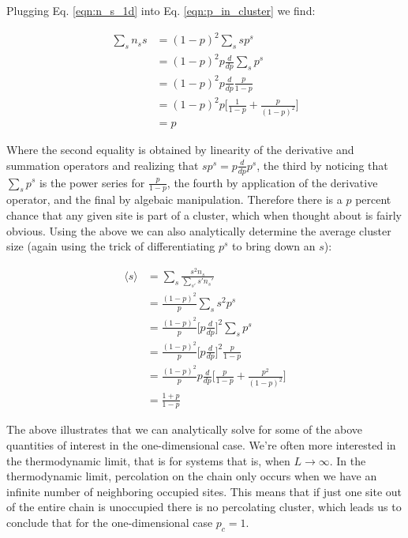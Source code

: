 Plugging Eq. \ref{eqn:n_s_1d} into Eq. \ref{eqn:p_in_cluster} we find:

\begin{equation}
\begin{split}
	\sum_s n_s s &= (1 - p)^2 \sum_s s p^s\\
	&= (1 - p)^2 p \frac{d}{dp} \sum_s p^s\\
	&= (1 - p)^2 p \frac{d}{dp} \frac{p}{1-p}\\
	&= (1 - p)^2 p \bigg[ \frac{1}{1-p} + \frac{p}{(1 - p)^2} \bigg]\\
	&= p
\end{split}
\end{equation}

Where the second equality is obtained by linearity of the derivative and summation operators and realizing that $s p^s = p \frac{d}{dp} p^s$, the third by noticing that $\sum_s p^s$ is the power series for $\frac{p}{1-p}$, the fourth by application of the derivative operator, and the final by algebaic manipulation.
Therefore there is a $p$ percent chance that any given site is part of a cluster, which when thought about is fairly obvious.
Using the above we can also analytically determine the average cluster size (again using the trick of differentiating $p^s$ to bring down an $s$):

\begin{equation}
\begin{split}
	\langle s \rangle &= \sum_s \frac{s^2 n_s}{\sum_{s'} s' n_s'}\\
	&= \frac{(1 - p)^2}{p} \sum_s s^2 p^s\\
	&= \frac{(1 - p)^2}{p} \bigg[p\frac{d}{dp}\bigg]^2 \sum_s p^s\\
	&= \frac{(1 - p)^2}{p} \bigg[p\frac{d}{dp}\bigg]^2 \frac{p}{1 - p}\\
	&= \frac{(1 - p)^2}{p} p \frac{d}{dp} \bigg[ \frac{p}{1-p} + \frac{p^2}{(1 - p)^2} \bigg]\\
	&= \frac{1 + p}{1 - p}
\end{split}
\end{equation}

The above illustrates that we can analytically solve for some of the above quantities of interest in the one-dimensional case.
We're often more interested in the thermodynamic limit, that is for systems that is, when $L \rightarrow \infty$.
In the thermodynamic limit, percolation on the chain only occurs when we have an infinite number of neighboring occupied sites.
This means that if just one site out of the entire chain is unoccupied there is no percolating cluster, which leads us to conclude that for the one-dimensional case $p_c = 1$.

